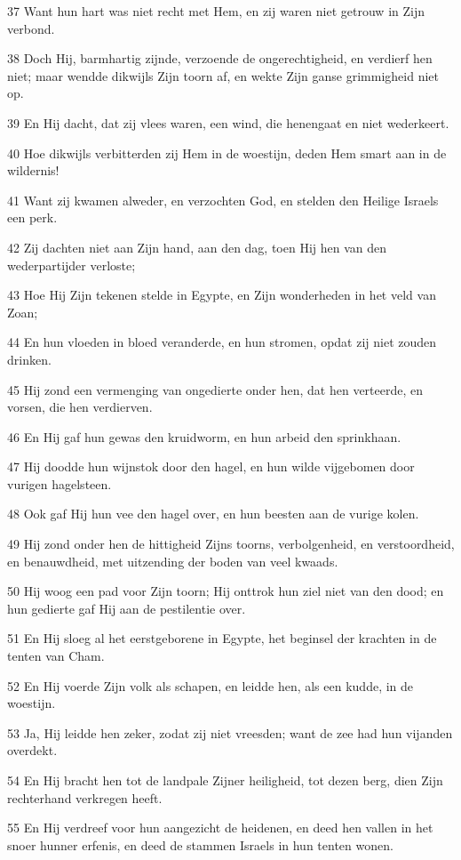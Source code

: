 \par 37 Want hun hart was niet recht met Hem, en zij waren niet getrouw in Zijn verbond.
\par 38 Doch Hij, barmhartig zijnde, verzoende de ongerechtigheid, en verdierf hen niet; maar wendde dikwijls Zijn toorn af, en wekte Zijn ganse grimmigheid niet op.
\par 39 En Hij dacht, dat zij vlees waren, een wind, die henengaat en niet wederkeert.
\par 40 Hoe dikwijls verbitterden zij Hem in de woestijn, deden Hem smart aan in de wildernis!
\par 41 Want zij kwamen alweder, en verzochten God, en stelden den Heilige Israels een perk.
\par 42 Zij dachten niet aan Zijn hand, aan den dag, toen Hij hen van den wederpartijder verloste;
\par 43 Hoe Hij Zijn tekenen stelde in Egypte, en Zijn wonderheden in het veld van Zoan;
\par 44 En hun vloeden in bloed veranderde, en hun stromen, opdat zij niet zouden drinken.
\par 45 Hij zond een vermenging van ongedierte onder hen, dat hen verteerde, en vorsen, die hen verdierven.
\par 46 En Hij gaf hun gewas den kruidworm, en hun arbeid den sprinkhaan.
\par 47 Hij doodde hun wijnstok door den hagel, en hun wilde vijgebomen door vurigen hagelsteen.
\par 48 Ook gaf Hij hun vee den hagel over, en hun beesten aan de vurige kolen.
\par 49 Hij zond onder hen de hittigheid Zijns toorns, verbolgenheid, en verstoordheid, en benauwdheid, met uitzending der boden van veel kwaads.
\par 50 Hij woog een pad voor Zijn toorn; Hij onttrok hun ziel niet van den dood; en hun gedierte gaf Hij aan de pestilentie over.
\par 51 En Hij sloeg al het eerstgeborene in Egypte, het beginsel der krachten in de tenten van Cham.
\par 52 En Hij voerde Zijn volk als schapen, en leidde hen, als een kudde, in de woestijn.
\par 53 Ja, Hij leidde hen zeker, zodat zij niet vreesden; want de zee had hun vijanden overdekt.
\par 54 En Hij bracht hen tot de landpale Zijner heiligheid, tot dezen berg, dien Zijn rechterhand verkregen heeft.
\par 55 En Hij verdreef voor hun aangezicht de heidenen, en deed hen vallen in het snoer hunner erfenis, en deed de stammen Israels in hun tenten wonen.
